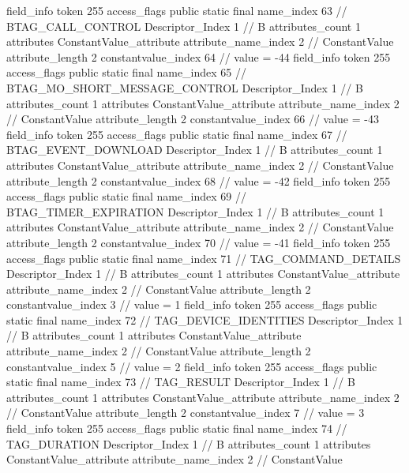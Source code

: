 {{{{{{{				}
				}
			}
			field_info {
				token	255
				access_flags	public static final
				name_index	63		// BTAG_CALL_CONTROL
				Descriptor_Index	1		// B
				attributes_count	1
				attributes {
				ConstantValue_attribute {
					attribute_name_index	2		// ConstantValue
					attribute_length	2
					constantvalue_index	64		// value = -44
				}
				}
			}
			field_info {
				token	255
				access_flags	public static final
				name_index	65		// BTAG_MO_SHORT_MESSAGE_CONTROL
				Descriptor_Index	1		// B
				attributes_count	1
				attributes {
				ConstantValue_attribute {
					attribute_name_index	2		// ConstantValue
					attribute_length	2
					constantvalue_index	66		// value = -43
				}
				}
			}
			field_info {
				token	255
				access_flags	public static final
				name_index	67		// BTAG_EVENT_DOWNLOAD
				Descriptor_Index	1		// B
				attributes_count	1
				attributes {
				ConstantValue_attribute {
					attribute_name_index	2		// ConstantValue
					attribute_length	2
					constantvalue_index	68		// value = -42
				}
				}
			}
			field_info {
				token	255
				access_flags	public static final
				name_index	69		// BTAG_TIMER_EXPIRATION
				Descriptor_Index	1		// B
				attributes_count	1
				attributes {
				ConstantValue_attribute {
					attribute_name_index	2		// ConstantValue
					attribute_length	2
					constantvalue_index	70		// value = -41
				}
				}
			}
			field_info {
				token	255
				access_flags	public static final
				name_index	71		// TAG_COMMAND_DETAILS
				Descriptor_Index	1		// B
				attributes_count	1
				attributes {
				ConstantValue_attribute {
					attribute_name_index	2		// ConstantValue
					attribute_length	2
					constantvalue_index	3		// value = 1
				}
				}
			}
			field_info {
				token	255
				access_flags	public static final
				name_index	72		// TAG_DEVICE_IDENTITIES
				Descriptor_Index	1		// B
				attributes_count	1
				attributes {
				ConstantValue_attribute {
					attribute_name_index	2		// ConstantValue
					attribute_length	2
					constantvalue_index	5		// value = 2
				}
				}
			}
			field_info {
				token	255
				access_flags	public static final
				name_index	73		// TAG_RESULT
				Descriptor_Index	1		// B
				attributes_count	1
				attributes {
				ConstantValue_attribute {
					attribute_name_index	2		// ConstantValue
					attribute_length	2
					constantvalue_index	7		// value = 3
				}
				}
			}
			field_info {
				token	255
				access_flags	public static final
				name_index	74		// TAG_DURATION
				Descriptor_Index	1		// B
				attributes_count	1
				attributes {
				ConstantValue_attribute {
					attribute_name_index	2		// ConstantValue
}}}}}}}
